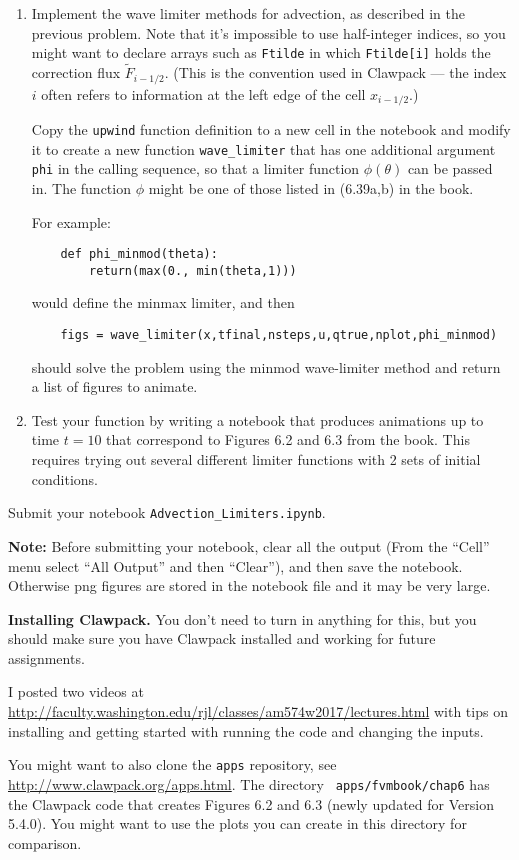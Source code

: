 \documentclass[11pt]{article}
\begin{document}
\renewcommand{\theenumi}{\alph{enumi}}  %
\begin{enumerate}

\item Implement the wave limiter methods for advection, as described in 
the previous problem.   Note that it's impossible to use half-integer
indices, so you might want to declare arrays such as \verb+Ftilde+ in which 
\verb+Ftilde[i]+ holds the correction flux $\widetilde F_{i-1/2}$.  (This is
the convention used in Clawpack --- the index $i$ often refers to
information at the left edge of the cell $x_{i-1/2}$.)

Copy the \verb+upwind+ function definition to a new cell in the notebook and
modify it to create a new function \verb+wave_limiter+ that has one
additional argument \verb+phi+ in the calling sequence, so that a limiter
function $\phi(\theta)$ can be passed in.  The function $\phi$ might be one
of those listed in (6.39a,b) in the book.  

For example:
\begin{verbatim}
    def phi_minmod(theta):
        return(max(0., min(theta,1)))
\end{verbatim}
would define the minmax limiter, and then
\begin{verbatim}
    figs = wave_limiter(x,tfinal,nsteps,u,qtrue,nplot,phi_minmod)
\end{verbatim}
should solve the problem using the minmod wave-limiter method and return a
list of figures to animate.

\item Test your function by writing a notebook that produces 
animations up to time $t=10$ that
correspond to Figures 6.2 and 6.3 from the book.
This requires trying out several different limiter functions with 2 sets of
initial conditions.  

\end{enumerate} 

Submit your notebook \verb+Advection_Limiters.ipynb+.

{\bf Note:} Before submitting your notebook, clear all the output (From the
``Cell'' menu select ``All Output'' and then ``Clear''), and then save the
notebook.  Otherwise png figures are stored in the notebook file and it may
be very large.  

\vskip 15pt
{\bf Installing Clawpack.} You don't need to turn in anything for this, but
you should make sure you have Clawpack installed and working for future
assignments. 

I posted two videos at
\url{http://faculty.washington.edu/rjl/classes/am574w2017/lectures.html}
with tips on installing and getting started with running the code and
changing the inputs.

You might want to also clone the {\tt apps} repository, see
\url{http://www.clawpack.org/apps.html}.  The directory {\tt
apps/fvmbook/chap6} has the Clawpack code that creates Figures 6.2 and 6.3
(newly updated for Version 5.4.0).  You might want to use the plots you can
create in this directory for comparison.
\end{document}
